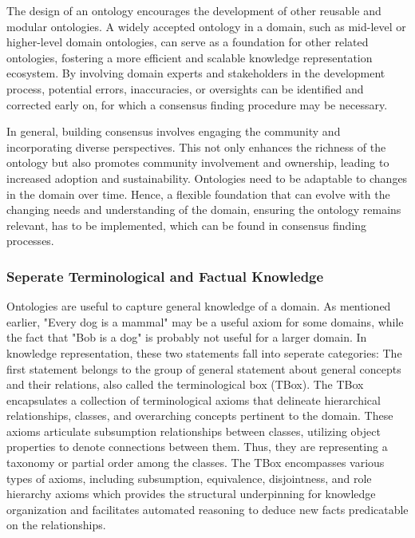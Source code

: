 The design of an ontology encourages the development of other reusable and modular ontologies. A widely accepted ontology in a domain, such as mid-level or higher-level domain ontologies, can serve as a foundation for other related ontologies, fostering a more efficient and scalable knowledge representation ecosystem. By involving domain experts and stakeholders in the development process, potential errors, inaccuracies, or oversights can be identified and corrected early on, for which a consensus finding procedure may be necessary.

In general, building consensus involves engaging the community and incorporating diverse perspectives. This not only enhances the richness of the ontology but also promotes community involvement and ownership, leading to increased adoption and sustainability.
Ontologies need to be adaptable to changes in the domain over time. Hence, a flexible foundation that can evolve with the changing needs and understanding of the domain, ensuring the ontology remains relevant, has to be implemented, which can be found in consensus finding processes.

\subsubsection{Seperate Terminological and Factual Knowledge}

Ontologies are useful to capture general knowledge of a domain. As mentioned earlier, "Every dog is a mammal" may be a useful axiom for some domains, while the fact that "Bob is a dog" is probably not useful for a larger domain. In knowledge representation, these two statements fall into seperate categories:
The first statement belongs to the group of general statement about general concepts and their relations, also called the terminological box (TBox). The TBox encapsulates a collection of terminological axioms that delineate hierarchical relationships, classes, and overarching concepts pertinent to the domain. These axioms articulate subsumption relationships between classes, utilizing object properties to denote connections between them. Thus, they are representing a taxonomy or partial order among the classes. The TBox encompasses various types of axioms, including subsumption, equivalence, disjointness, and role hierarchy axioms which provides the structural underpinning for knowledge organization and facilitates automated reasoning to deduce new facts predicatable on the relationships.

